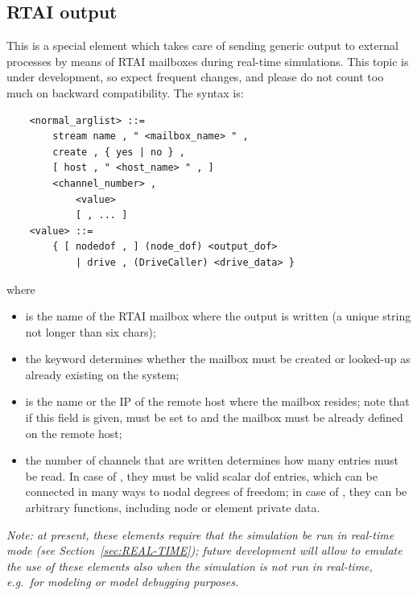 \subsection{RTAI output}\label{sec:EL:BASE:RTAI_out}
This is a special element which takes care of sending generic output
to external processes by means of RTAI mailboxes during real-time 
simulations.
This topic is under development, so expect frequent changes, and
please do not count too much on backward compatibility.
The syntax is:
\begin{verbatim}
    <normal_arglist> ::=
        stream name , " <mailbox_name> " ,
        create , { yes | no } ,
        [ host , " <host_name> " , ]
        <channel_number> ,
            <value>
            [ , ... ]
    <value> ::=
        { [ nodedof , ] (node_dof) <output_dof>
            | drive , (DriveCaller) <drive_data> }
\end{verbatim}
where
\begin{itemize}
\item {} is the name of the RTAI mailbox where 
the output is written  (a unique string not longer than six chars);
\item the  keyword determines whether the mailbox
must be created or looked-up as already existing on the system;
\item {} is the name or the IP of the remote host where
the mailbox resides; note that if this field is given,  must
be set to  and the mailbox must be already defined
on the remote host;
\item the number of channels  that are written
determines how many  entries must be read.
In case of , they must be valid scalar dof entries,
which can be connected in many ways to nodal degrees of freedom;
in case of , they can be arbitrary functions,
including node or element private data.
\end{itemize}

\emph{Note: at present, these elements require that the simulation
be run in real-time mode (see Section~\ref{sec:REAL-TIME});
future development will allow to emulate the use of these elements
also when the simulation is not run in real-time, e.g.\ for modeling
or model debugging purposes.}






